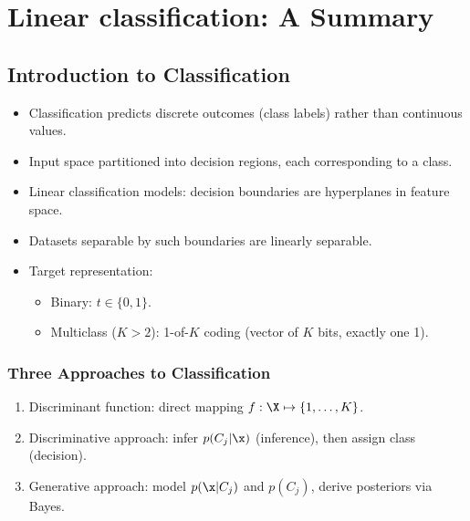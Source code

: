 
\chapter{Linear classification: A Summary}

\section*{Introduction to Classification}

\begin{itemize}
    \item Classification predicts discrete outcomes (class labels) rather than continuous values.
    \item Input space partitioned into \alert{decision regions}, each corresponding to a class.
    \item \alert{Linear classification models}: decision boundaries are hyperplanes in feature space.
    \item Datasets separable by such boundaries are \alert{linearly separable}.
    \item Target representation:
    \begin{itemize}
        \item Binary: $t\in\{0,1\}$.
        \item Multiclass ($K>2$): \alert{1-of-$K$ coding} (vector of $K$ bits, exactly one 1).
    \end{itemize}
\end{itemize}

\subsection*{Three Approaches to Classification}

\begin{enumerate}
    \item \alert{Discriminant function}: direct mapping $f:\X\mapsto\{1,\ldots,K\}$.
    \item \alert{Discriminative approach}: infer $p(C_{j}|\x)$ (inference), then assign class (decision).
    \item \alert{Generative approach}: model $p(\x|C_{j})$ and $p(C_{j})$, derive posteriors via Bayes.
\end{enumerate}

